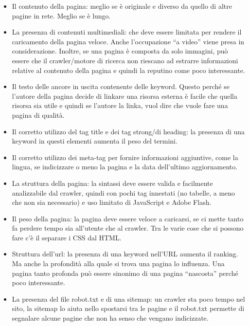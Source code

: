 \begin{itemize}
	\item Il contenuto della pagina: meglio se è originale e diverso da quello di altre pagine in rete. Meglio se è lungo.
	\item La presenza di contenuti multimediali: che deve essere limitata per rendere il caricamento della pagina veloce. Anche l'occupazione ``a video'' viene presa in considerazione. Inoltre, se una pagina è composta da solo immagini, può essere che il crawler/motore di ricerca non riescano ad estrarre informazioni relative al contenuto della pagina e quindi la reputino come poco interessante.
	\item Il testo delle ancore in uscita contenente delle keyword. Questo perché se l'autore della pagina decide di linkare una risorsa esterna è facile che quella risorsa sia utile e quindi se l'autore la linka, vuol dire che vuole fare una pagina di qualità.
	\item Il corretto utilizzo del tag title e dei tag strong/di heading: la presenza di una keyword in questi elementi aumenta il peso del termini.
	\item Il corretto utilizzo dei meta-tag per fornire informazioni aggiuntive, come la lingua, se indicizzare o meno la pagina e la data dell'ultimo aggiornamento.
	\item La struttura della pagina: la sintassi deve essere valida e facilmente analizzabile dal crawler, quindi con pochi tag innestati (no tabelle, a meno che non sia necessario) e uso limitato di JavaScript e Adobe Flash.
	\item Il peso della pagina: la pagina deve essere veloce a caricarsi, se ci mette tanto fa perdere tempo sia all'utente che al crawler. Tra le varie cose che si possono fare c'è il separare i CSS dal HTML.
	\item Struttura dell'url: la presenza di una keyword nell'URL aumenta il ranking. Ma anche la profondità alla quale si trova una pagina lo influenza. Una pagina tanto profonda può essere sinonimo di una pagina ``nascosta'' perché poco interessante.
	\item La presenza del file robot.txt e di una sitemap: un crawler sta poco tempo nel sito, la sitemap lo aiuta nello spostarsi tra le pagine e il robot.txt permette di segnalare alcune pagine che non ha senso che vengano indicizzate.
\end{itemize}











